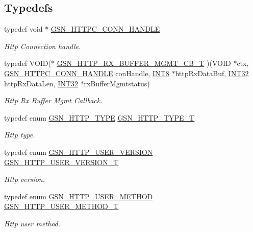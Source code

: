 \subsection*{Typedefs}
\begin{DoxyCompactItemize}
\item 
typedef void $\ast$ \hyperlink{a00665_ga873d4cd3603c5dd91494d571445cc7f7}{GSN\_\-HTTPC\_\-CONN\_\-HANDLE}
\begin{DoxyCompactList}\small\item\em Http Connection handle. \end{DoxyCompactList}\item 
typedef VOID($\ast$ \hyperlink{a00665_ga4f384de3cef47243fc55fee382201152}{GSN\_\-HTTP\_\-RX\_\-BUFFER\_\-MGMT\_\-CB\_\-T} )(VOID $\ast$ctx, \hyperlink{a00665_ga873d4cd3603c5dd91494d571445cc7f7}{GSN\_\-HTTPC\_\-CONN\_\-HANDLE} conHandle, \hyperlink{a00660_ga307b8734c020247f6bac4fcde0dcfbb9}{INT8} $\ast$httpRxDataBuf, \hyperlink{a00660_ga63021d67d54286c2163bcdb43a6f2569}{INT32} httpRxDataLen, \hyperlink{a00660_ga63021d67d54286c2163bcdb43a6f2569}{INT32} $\ast$rxBufferMgmtstatus)
\begin{DoxyCompactList}\small\item\em Http Rx Buffer Mgmt Callback. \end{DoxyCompactList}\item 
typedef enum \hyperlink{a00665_ga918ab72c19100d330e6d4854b0ac0612}{GSN\_\-HTTP\_\-TYPE} \hyperlink{a00665_ga72317a89375e9f3d889df0439bff53ba}{GSN\_\-HTTP\_\-TYPE\_\-T}
\begin{DoxyCompactList}\small\item\em Http type. \end{DoxyCompactList}\item 
typedef enum \hyperlink{a00665_ga91d9306148208fe7d577c525bc69fb3b}{GSN\_\-HTTP\_\-USER\_\-VERSION} \hyperlink{a00665_ga8a5357a42219f22430d5bf97d136092d}{GSN\_\-HTTP\_\-USER\_\-VERSION\_\-T}
\begin{DoxyCompactList}\small\item\em Http version. \end{DoxyCompactList}\item 
typedef enum \hyperlink{a00665_ga23245efd9f2c5fead55d4b1f075bd6bf}{GSN\_\-HTTP\_\-USER\_\-METHOD} \hyperlink{a00665_ga19c754176c7cf6f41749aa60c125ee7e}{GSN\_\-HTTP\_\-USER\_\-METHOD\_\-T}
\begin{DoxyCompactList}\small\item\em Http user method. \end{DoxyCompactList}\item 

\end{DoxyCompactItemize}
